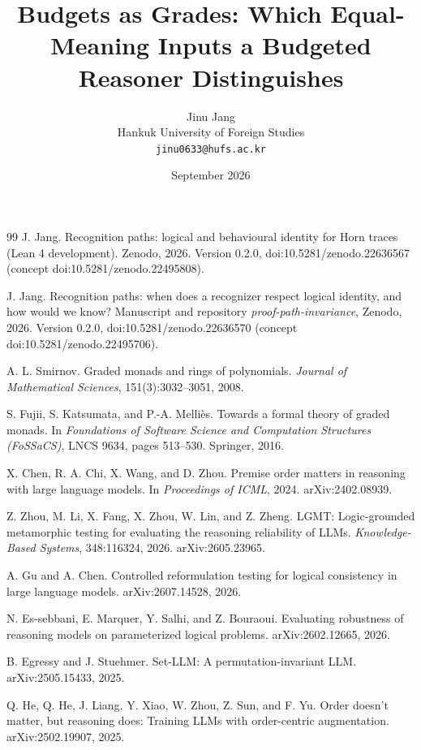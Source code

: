 \documentclass[10pt]{article}
\title{Budgets as Grades: Which Equal-Meaning Inputs a Budgeted Reasoner Distinguishes}
\author{Jinu Jang\\
Hankuk University of Foreign Studies\\
\texttt{jinu0633@hufs.ac.kr}}
\date{September 2026}
\begin{document}
\maketitle


\begin{thebibliography}{99}
J. Jang.
Recognition paths: logical and behavioural identity for Horn traces (Lean 4 development).
Zenodo, 2026. Version 0.2.0, doi:10.5281/zenodo.22636567 (concept doi:10.5281/zenodo.22495808).

J. Jang.
Recognition paths: when does a recognizer respect logical identity, and how would we know?
Manuscript and repository \emph{proof-path-invariance}, Zenodo, 2026. Version 0.2.0, doi:10.5281/zenodo.22636570 (concept doi:10.5281/zenodo.22495706).

A. L. Smirnov.
Graded monads and rings of polynomials.
\emph{Journal of Mathematical Sciences}, 151(3):3032--3051, 2008.

S. Fujii, S. Katsumata, and P.-A. Melli\`es.
Towards a formal theory of graded monads.
In \emph{Foundations of Software Science and Computation Structures (FoSSaCS)}, LNCS 9634, pages 513--530. Springer, 2016.

X. Chen, R. A. Chi, X. Wang, and D. Zhou.
Premise order matters in reasoning with large language models.
In \emph{Proceedings of ICML}, 2024. arXiv:2402.08939.

Z. Zhou, M. Li, X. Fang, X. Zhou, W. Lin, and Z. Zheng.
LGMT: Logic-grounded metamorphic testing for evaluating the reasoning reliability of LLMs.
\emph{Knowledge-Based Systems}, 348:116324, 2026. arXiv:2605.23965.

A. Gu and A. Chen.
Controlled reformulation testing for logical consistency in large language models.
arXiv:2607.14528, 2026.

N. Es-sebbani, E. Marquer, Y. Salhi, and Z. Bouraoui.
Evaluating robustness of reasoning models on parameterized logical problems.
arXiv:2602.12665, 2026.

B. Egressy and J. Stuehmer.
Set-LLM: A permutation-invariant LLM.
arXiv:2505.15433, 2025.

Q. He, Q. He, J. Liang, Y. Xiao, W. Zhou, Z. Sun, and F. Yu.
Order doesn't matter, but reasoning does: Training LLMs with order-centric augmentation.
arXiv:2502.19907, 2025.


\end{thebibliography}
\end{document}
